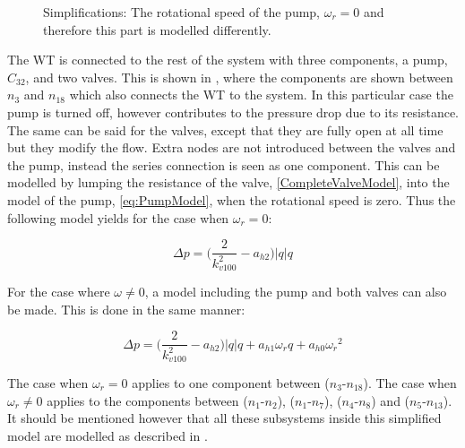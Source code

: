 \begin{figure}[H]
	\centering
	 
	\caption{Simplifications: The rotational speed of the pump, $\omega_r = 0$ and therefore this part is modelled differently.}
	  \label{fig:subsys_1}
\end{figure}

The WT is connected to the rest of the system with three components, a pump, $C_{32}$, and two valves. This is shown in , where the components are shown between $n_3$ and $n_{18}$ which also connects the WT to the system. In this particular case the pump is turned off, however contributes to the pressure drop due to its resistance. The same can be said for the valves, except that they are fully open at all time but they modify the flow. Extra nodes are not introduced between the valves and the pump, instead the series connection is seen as one component. This can be modelled by lumping the resistance of the valve, \eqref{CompleteValveModel}, into the model of the pump, \eqref{eq:PumpModel}, when the rotational speed is zero. Thus the following model yields for the case when $\omega_r = 0$:

\begin{equation}
  \Delta p = \Big(\frac{2}{k_{v100}^2} - a_{h2}\Big)|q| q 
  \label{omega_zero}
\end{equation}

For the case where $\omega \neq 0$, a model including the pump and both valves can also be made. This is done in the same manner: 

\begin{equation}
  \Delta p = \Big(\frac{2}{k_{v100}^2} - a_{h2}\Big)|q| q  + a_{h1} \omega_r q + a_{h0}{\omega_r}^2
  \label{omega_notzero}
\end{equation}

The case when $\omega_r = 0$ applies to one component between ($n_3$-$n_{18}$). The case when $\omega_r \neq 0$ applies to the components between ($n_1$-$n_2$), ($n_1$-$n_7$), ($n_4$-$n_8$) and ($n_5$-$n_{13}$). It should be mentioned however that all these subsystems inside this simplified model are modelled as described in . 
\\

